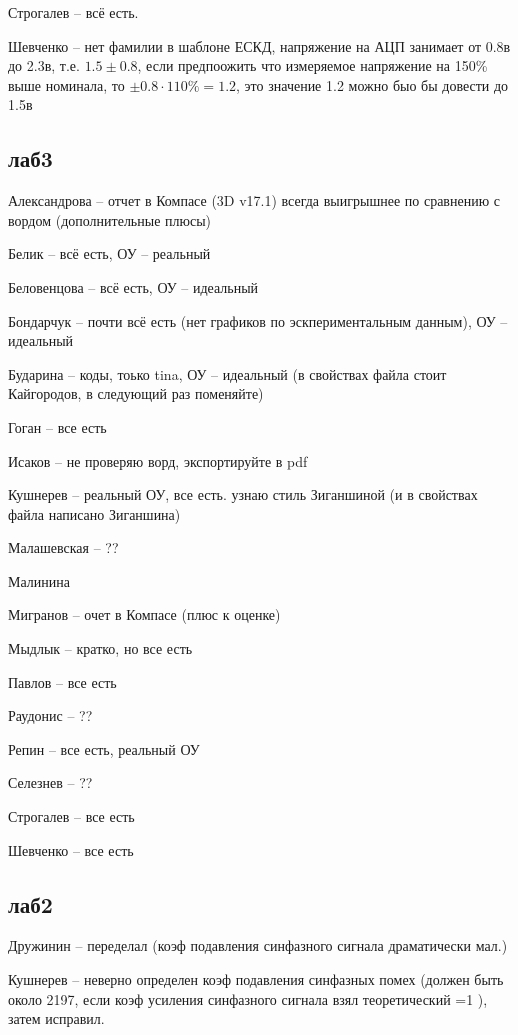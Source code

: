 \documentclass[a4paper,11pt]{article}
\begin{document}
Строгалев -- всё есть.

Шевченко -- нет фамилии в шаблоне ЕСКД, напряжение на АЦП занимает от 0.8в до 2.3в, т.е. $1.5\pm0.8$, если предпоожить что измеряемое напряжение на 150\% выше
номинала, то $\pm0.8\cdot110\% = 1.2$, это значение 1.2 можно быо бы довести до 1.5в
\newpage
\subsection*{лаб3}
Александрова -- отчет в Компасе (3D v17.1) всегда выигрышнее по сравнению с вордом (дополнительные плюсы)

Белик -- всё есть, ОУ -- реальный

Беловенцова  -- всё есть, ОУ -- идеальный

Бондарчук -- почти всё есть (нет графиков по эскпериментальным данным), ОУ -- идеальный

Бударина -- коды, тоько tina, ОУ -- идеальный  (в свойствах файла стоит Кайгородов, в следующий раз поменяйте)

Гоган  -- все есть

Исаков -- не проверяю ворд, экспортируйте в pdf

Кушнерев -- реальный ОУ, все есть. узнаю стиль  Зиганшиной (и в свойствах файла написано Зиганшина)

Малашевская -- ?? %

Малинина 

Мигранов -- очет в Компасе (плюс к оценке)

Мыдлык -- кратко, но все есть

Павлов -- все есть

Раудонис -- ??

Репин -- все есть, реальный ОУ

Селезнев -- ?? %

Строгалев -- все есть 

Шевченко -- все есть

\newpage
\subsection*{лаб2}

Дружинин -- переделал (коэф подавления синфазного сигнала драматически мал.)

Кушнерев -- неверно определен коэф подавления синфазных помех (должен быть около 2197, если коэф усиления синфазного сигнала взял теоретический =1 ), затем исправил.
\end{document}
